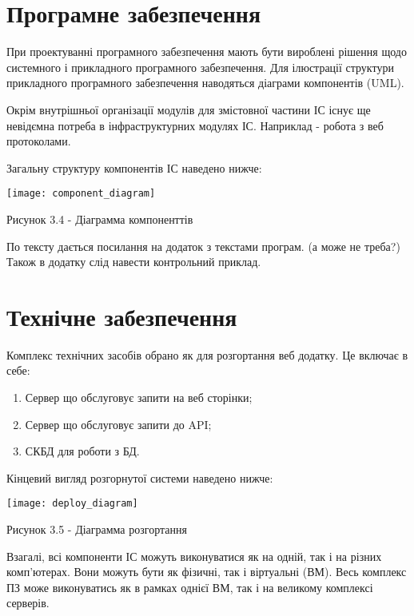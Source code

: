 \section{Програмне забезпечення}

При проектуванні програмного забезпечення мають бути вироблені рішення щодо системного і прикладного програмного забезпечення.
Для ілюстрації структури прикладного програмного забезпечення наводяться діаграми компонентів (UML).

Окрім внутрішньої організації модулів для змістовної частини ІС існує ще невідємна потреба в інфраструктурних модулях ІС. Наприклад -  робота з веб протоколами.

Загальну структуру компонентів ІС наведено нижче:

\begin{center}

\texttt{[image: component\_diagram]}

Рисунок 3.4 - Діаграмма компоненттів
\end{center}

По тексту дається посилання на додаток з текстами програм. (а може не треба?)
Також в додатку слід навести контрольний приклад.

\section{Технічне забезпечення}

Комплекс технічних засобів обрано як для розгортання веб додатку. Це включає в себе:

\begin{enumerate}

\item Сервер що обслуговує запити на веб сторінки;

\item Сервер що обслуговує запити до API;

\item СКБД для роботи з БД.

\end{enumerate}

Кінцевий вигляд розгорнутої системи наведено нижче:

\begin{center}

\texttt{[image: deploy\_diagram]}

Рисунок 3.5 - Діаграмма розгортання

\end{center}

Взагалі, всі компоненти ІС можуть виконуватися як на одній, так і на різних комп'ютерах.  Вони можуть бути як фізичні, так і віртуальні (ВМ). Весь комплекс ПЗ може виконуватись як в рамках однієї ВМ, так і на великому комплексі серверів.

